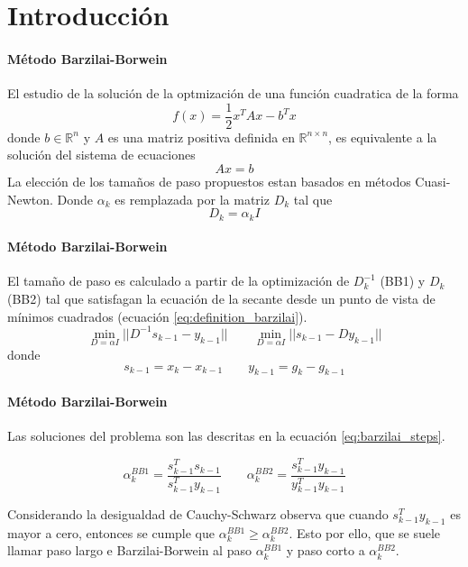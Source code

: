 \titleframe

\section{Introducción}

\begin{frame}{\insertsectionhead}
    \framesubtitle{Método Barzilai-Borwein}
    El estudio de la solución de la optmización de una función cuadratica de la forma
    \begin{equation}
        f(x) = \frac{1}{2}x^TAx- b^Tx \label{eq:quadratic_function}
    \end{equation}
    donde $b\in\mathbb{R}^n$ y $A$ es una matriz positiva definida en $\mathbb{R}^{n\times n}$, es equivalente a la solución del sistema de ecuaciones
    \begin{equation*}
        Ax=b
    \end{equation*}
    La elección de los tamaños de paso propuestos estan basados en métodos Cuasi-Newton. Donde $\alpha_k$ es remplazada por la matriz $D_k$ tal que
    \begin{equation}
        D_k = \alpha_k \mathit{I}
    \end{equation}
\end{frame}

\begin{frame}{\insertsectionhead}
    \framesubtitle{Método Barzilai-Borwein}
    El tamaño de paso es calculado a partir de la optimización de $D_k^{-1}$  (BB1) y  $D_k$ (BB2) tal que satisfagan la ecuación de la secante desde un punto de vista de mínimos cuadrados (ecuación \ref{eq:definition_barzilai}).
    \begin{equation}
        \min_{D=\alpha \mathit{I}} ||D^{-1}s_{k-1}-y_{k-1}|| \qquad \min_{D=\alpha \mathit{I}} ||s_{k-1}-Dy_{k-1}|| \label{eq:definition_barzilai}
    \end{equation}
    donde
    \begin{equation*}
        s_{k-1} = x_k - x_{k-1} \qquad y_{k-1} = g_k - g_{k-1}
    \end{equation*}
\end{frame}

\begin{frame}{\insertsectionhead}
    \framesubtitle{Método Barzilai-Borwein}

    Las soluciones del problema son las descritas en la ecuación \ref{eq:barzilai_steps}.

    \begin{equation}
        \alpha^{BB1}_k = \frac{s^T_{k-1}s_{k-1}}{s^T_{k-1}y_{k-1}} \qquad \alpha_k^{BB2} = \frac{s_{k-1}^Ty_{k-1}}{y_{k-1}^Ty_{k-1}} \label{eq:barzilai_steps}
    \end{equation}

    Considerando la desigualdad de Cauchy-Schwarz observa que cuando $s_{k-1}^Ty_{k-1}$ es mayor a cero, entonces se cumple que $\alpha_k^{BB1} \geq \alpha_k^{BB2}$. Esto por ello, que se suele llamar paso largo e Barzilai-Borwein al paso $\alpha_k^{BB1}$ y paso corto a $\alpha_k^{BB2}$.
\end{frame}